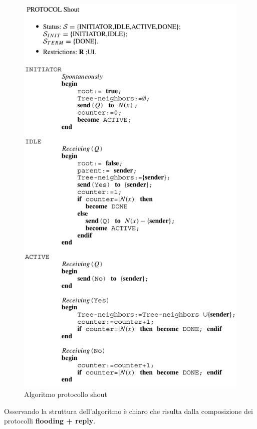 \documentclass[12pt]{article}
\begin{document}
			\begin{figure}[h!]
				\centering
				\includegraphics[scale=0.48]{img/shout.png}
				\caption{Algoritmo protocollo shout}
			\end{figure}
		Osservando la struttura dell'algoritmo è chiaro che risulta dalla composizione dei protocolli \textbf{flooding + reply}.
\end{document}
